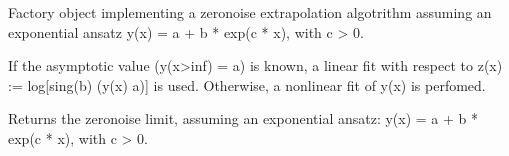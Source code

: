 \documentclass[letterpaper,10pt,english]{sphinxmanual}
\begin{document}
\begin{fulllineitems}
\label{\detokenize{apidoc:mitiq.factories.ExpFactory}}
Factory object implementing a zero\sphinxhyphen{}noise extrapolation algotrithm assuming an
exponential ansatz y(x) = a + b * exp(\sphinxhyphen{}c * x), with c \textgreater{} 0.

If the asymptotic value (y(x\sphinxhyphen{}\textgreater{}inf) = a) is known, a linear fit with respect
to z(x) := log{[}sing(b) (y(x) \sphinxhyphen{} a){]} is used.
Otherwise, a non\sphinxhyphen{}linear fit of y(x) is perfomed.

\begin{fulllineitems}
\label{\detokenize{apidoc:mitiq.factories.ExpFactory.reduce}}
Returns the zero\sphinxhyphen{}noise limit, assuming an exponential ansatz:
y(x) = a + b * exp(\sphinxhyphen{}c * x), with c \textgreater{} 0.

\end{fulllineitems}


\end{fulllineitems}

\end{document}
